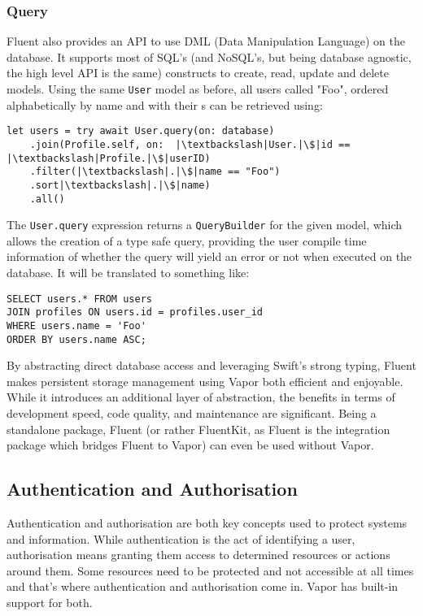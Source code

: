 \subsubsection{Query}
Fluent also provides an API to use DML (Data Manipulation Language) on the database. It supports most of SQL's (and NoSQL's, but being database agnostic, the high level API is the same) constructs to create, read, update and delete models. Using the same \lstinline{User} model as before, all users called "Foo", ordered alphabetically by name and with their s can be retrieved using:
\begin{verbatim}
let users = try await User.query(on: database)
    .join(Profile.self, on:  |\textbackslash|User.|\$|id ==  |\textbackslash|Profile.|\$|userID)
    .filter(|\textbackslash|.|\$|name == "Foo")
    .sort|\textbackslash|.|\$|name)
    .all()
\end{verbatim}
The \lstinline{User.query} expression returns a \lstinline{QueryBuilder} for the given model, which allows the creation of a type safe query, providing the user compile time information of whether the query will yield an error or not when executed on the database. It will be translated to something like:
\begin{verbatim}
SELECT users.* FROM users
JOIN profiles ON users.id = profiles.user_id
WHERE users.name = 'Foo'
ORDER BY users.name ASC;
\end{verbatim}
\cite{vapor-docs}

By abstracting direct database access and leveraging Swift's strong typing, Fluent makes persistent storage management using Vapor both efficient and enjoyable. While it introduces an additional layer of abstraction, the benefits in terms of development speed, code quality, and maintenance are significant. Being a standalone package, Fluent (or rather FluentKit, as Fluent is the integration package which bridges Fluent to Vapor) can even be used without Vapor.

\subsection{Authentication and Authorisation}
Authentication and authorisation are both key concepts used to protect systems and information. While authentication is the act of identifying a user, authorisation means granting them access to determined resources or actions around them. \cite{chapman-auth} Some resources need to be protected and not  accessible at all times and that's where authentication and authorisation come in. Vapor has built-in support for both.

